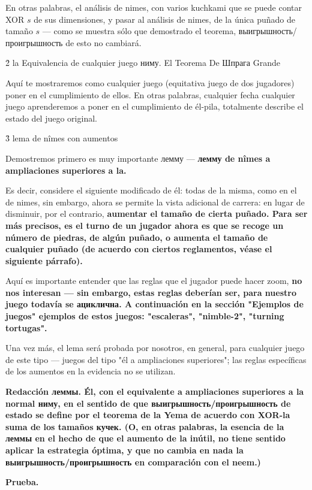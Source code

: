 En otras palabras, el análisis de nimes, con varios kuchkami que se puede contar XOR $s$ de sus dimensiones, y pasar al análisis de nimes, de la única puñado de tamaño $s$ --- como se muestra sólo que demostrado el teorema, выигрышность/проигрышность de esto no cambiará.


\h2{ la Equivalencia de cualquier juego ниму. El Teorema De Шпрага Grande }

Aquí te mostraremos como cualquier juego (equitativa juego de dos jugadores) poner en el cumplimiento de ellos. En otras palabras, cualquier fecha cualquier juego aprenderemos a poner en el cumplimiento de él-pila, totalmente describe el estado del juego original.


\h3{ lema de nîmes con aumentos }

Demostremos primero es muy importante лемму --- \bf{лемму de nîmes a ampliaciones superiores a la}.

Es decir, considere el siguiente modificado de él: todas de la misma, como en el de nimes, sin embargo, ahora se permite la vista adicional de carrera: en lugar de disminuir, por el contrario, \bf{aumentar el tamaño de cierta puñado}. Para ser más precisos, es el turno de un jugador ahora es que se recoge un número de piedras, de algún puñado, o aumenta el tamaño de cualquier puñado (de acuerdo con ciertos reglamentos, véase el siguiente párrafo).

Aquí es importante entender que las reglas que el jugador puede hacer zoom, \bf{no nos interesan} --- sin embargo, estas reglas deberían ser, para nuestro juego todavía se \bf{ациклична}. A continuación en la sección "Ejemplos de juegos" ejemplos de estos juegos: "escaleras", "nimble-2", "turning tortugas".

Una vez más, el lema será probada por nosotros, en general, para cualquier juego de este tipo --- juegos del tipo "él a ampliaciones superiores"; las reglas específicas de los aumentos en la evidencia no se utilizan.

\bf{Redacción леммы}. Él, con el equivalente a ampliaciones superiores a la normal ниму, en el sentido de que выигрышность/проигрышность de estado se define por el teorema de la Yema de acuerdo con XOR-la suma de los tamaños кучек. (O, en otras palabras, la esencia de la леммы en el hecho de que el aumento de la inútil, no tiene sentido aplicar la estrategia óptima, y que no cambia en nada la выигрышность/проигрышность en comparación con el neem.)

\bf{Prueba}.


